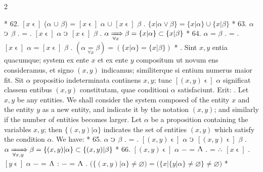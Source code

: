\documentclass{book}
\newcommand{\C}{\mathop{\sbox0{$\displaystyle$$\reflectbox{C}$} %
\raisebox{-\height+\ht0-0.05cm}[\ht0][\dp0]{\scalebox{0.8}[0.8]{\copy0}}}\displaylimits} %
\newcommand{\pppNoSpace}{\leavevmode\lower0ex\hbox{.}\kern-0.1em\raise0.7ex\hbox{.}\kern-0.1em\lower0ex\hbox{.}} %
\newcommand{\abs}{\mathop{\rotatebox[origin=c]{180}{V}}}
\newcommand{\smallIn}{\ensuremath{\mathrel{\epsilon}}}
\renewcommand{\xrightarrow}{\xRightarrow}
\newenvironment{translateTwoCol}
               { %
                 \columnratio{0.5, 0.5}
                 \begin{paracol}{2}
                 \newcommand{\LAT}{\switchcolumn[0]*}
                 \newcommand{\ENG}{\switchcolumn[1]}
               }
               { %
                 \let\ENG\undefined
                 \let\LAT\undefined
                 \end{paracol}
               }
\begin{document}
\begin{translateTwoCol}
\LAT
62. \hspace{0.67cm} $[x\smallIn]$ ($\alpha$ $\cup$ $\beta$) = $[x\smallIn]$ $\alpha$ $\cup$ $[x\smallIn]$ $\beta$
\ENG
62. \hspace{0.67cm} $\{ x | \alpha \vee \beta \} = \{ x | \alpha \} \cup \{ x | \beta \}$
\LAT
63. \hspace{0.67cm} $\alpha$ $\C$ $\beta$ . = . $[x\smallIn]$ $\alpha$  $\C$ $[x\smallIn]$ $\beta$
\ENG
63. \hspace{0.67cm} $\alpha \xrightarrow[\forall x]{} \beta = \{x | \alpha\} \subset \{x | \beta \}$
\LAT
64. \hspace{0.67cm} $\alpha$ = $\beta$ . = . $[x\smallIn]$ $\alpha$ = $[x\smallIn]$ $\beta$
\ENG
64. \hspace{0.67cm} $(\alpha \underset{\forall x}= \beta) = (\{ x |  \alpha\} = \{x | \beta \} )$
\LAT
{}. Sint $x,y$ entia quacumque; system ex ente $x$ et ex ente $y$ compositum ut novum ens consideramus, et signo $(x,y)$ indicamus; similiterque si entium numerus maior fit. Sit $\alpha$ propositio indeterminata continens $x,y$; tunc $[(x,y)\smallIn]$ $\alpha$ significat classem entibus $(x,y)$ constitutam, quae conditioni $\alpha$ satisfaciunt. Erit:
\ENG
{}. Let $x,y$ be any entities. We shall consider the system composed of the entity $x$ and the entity $y$ as a new entity, and indicate it by the notation $(x,y)$; and similarly if the number of entities becomes larger. Let $\alpha$ be a proposition containing the variables $x,y$; then $\{(x,y) | \alpha \}$ indicates the set of entities $(x,y)$ which satisfy the condition $\alpha$. We have:   %
\LAT
65. \hspace{0.67cm} $\alpha$ $\C$ $\beta$ . = . $[(x, y)\smallIn]$ $\alpha$  $\C$ $[(x, y)\smallIn]$ $\beta$
\ENG
65. \hspace{0.67cm} $\alpha \xrightarrow[\forall x,y]{} \beta = \{(x,y) | \alpha\} \subset \{(x,y) | \beta \}$
\LAT
66. \hspace{0.67cm} $[(x, y)\smallIn]$ $\alpha$ $-$ = $\abs$ . = $\pppNoSpace$ $[x\smallIn]$ . $[y\smallIn]$ $\alpha$ $-$ = $\abs$ : $-$ = $\abs$
\ENG
66. \hspace{0.67cm} $\Big( \{ (x,y) | \alpha \} \neq \varnothing \Big) = \Big( \{ x | \{ y | \alpha \} \neq \varnothing \} \neq \varnothing \Big)$   %
\LAT

\end{translateTwoCol}
\end{document}
